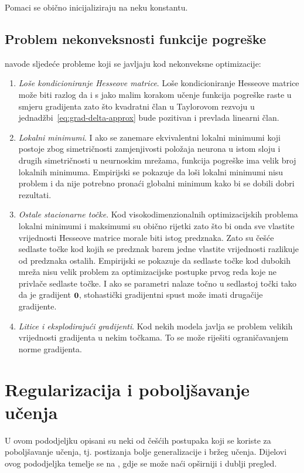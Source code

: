 \documentclass[utf8, diplomski, lmodern]{fer}
\begin{document}
Pomaci se obično inicijaliziraju na neku konstantu.

\subsection{Problem nekonveksnosti funkcije pogreške}

\citet{Goodfellow:2016:DL} navode sljedeće probleme koji se javljaju kod nekonveksne optimizacije:
\begin{enumerate}
	\item \emph{Loše kondicioniranje Hesseove matrice}. Loše kondicioniranje Hesseove matrice može biti razlog da i s jako malim korakom učenje funkcija pogreške raste u smjeru gradijenta zato što kvadratni član u Taylorovom rezvoju u jednadžbi~\eqref{eq:grad-delta-approx}  bude pozitivan i prevlada linearni član.
	\item \emph{Lokalni minimumi}. I ako se zanemare ekvivalentni lokalni minimumi koji postoje zbog simetričnosti zamjenjivosti položaja neurona u istom sloju i drugih simetričnosti u neurnoskim mrežama, funkcija pogreške ima velik broj lokalnih minimuma. Empirijski se pokazuje da loši lokalni minimumi nisu problem i da nije potrebno pronaći globalni minimum kako bi se dobili dobri rezultati.
	\item \emph{Ostale stacionarne točke}. Kod visokodimenzionalnih optimizacijskih problema lokalni minimumi i maksimumi su obično rijetki zato što bi onda sve vlastite vrijednosti Hesseove matrice morale biti istog predznaka. Zato su češće sedlaste točke kod kojih se predznak barem jedne vlastite vrijednosti razlikuje od predznaka ostalih. Empirijski se pokazuje da sedlaste točke kod dubokih mreža nisu velik problem za optimizacijske postupke prvog reda koje ne privlače sedlaste točke. I ako se parametri nalaze točno u sedlastoj točki tako da je gradijent $\mathbf{0}$, stohastički gradijentni spust može imati drugačije gradijente.
	\item \emph{Litice i eksplodirajući gradijenti}. Kod nekih modela javlja se problem velikih vrijednosti gradijenta u nekim točkama. To se može riješiti ograničavanjem norme gradijenta.
\end{enumerate}


\section{Regularizacija i poboljšavanje učenja}

U ovom pododjeljku opisani su neki od češćih postupaka koji se koriste za poboljšavanje učenja, tj. postizanja bolje generalizacije i bržeg učenja. Dijelovi ovog pododjeljka temelje se na \citet{Goodfellow:2016:DL}, gdje se može naći opširniji i dublji pregled.
\end{document}
